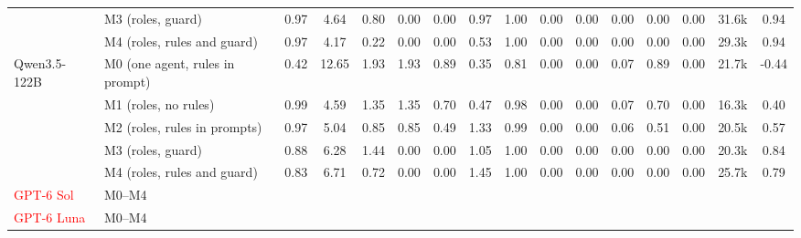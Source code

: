 \begin{tabular}{llcccccccccccccc}
 & M3 (roles, guard) & 0.97 & 4.64 & 0.80 & 0.00 & 0.00 & 0.97 & 1.00 & 0.00 & 0.00 & 0.00 & 0.00 & 0.00 & 31.6k & 0.94 \\
 & M4 (roles, rules and guard) & 0.97 & 4.17 & 0.22 & 0.00 & 0.00 & 0.53 & 1.00 & 0.00 & 0.00 & 0.00 & 0.00 & 0.00 & 29.3k & 0.94 \\
\midrule
Qwen3.5-122B & M0 (one agent, rules in prompt) & 0.42 & 12.65 & 1.93 & 1.93 & 0.89 & 0.35 & 0.81 & 0.00 & 0.00 & 0.07 & 0.89 & 0.00 & 21.7k & -0.44 \\
 & M1 (roles, no rules) & 0.99 & 4.59 & 1.35 & 1.35 & 0.70 & 0.47 & 0.98 & 0.00 & 0.00 & 0.07 & 0.70 & 0.00 & 16.3k & 0.40 \\
 & M2 (roles, rules in prompts) & 0.97 & 5.04 & 0.85 & 0.85 & 0.49 & 1.33 & 0.99 & 0.00 & 0.00 & 0.06 & 0.51 & 0.00 & 20.5k & 0.57 \\
 & M3 (roles, guard) & 0.88 & 6.28 & 1.44 & 0.00 & 0.00 & 1.05 & 1.00 & 0.00 & 0.00 & 0.00 & 0.00 & 0.00 & 20.3k & 0.84 \\
 & M4 (roles, rules and guard) & 0.83 & 6.71 & 0.72 & 0.00 & 0.00 & 1.45 & 1.00 & 0.00 & 0.00 & 0.00 & 0.00 & 0.00 & 25.7k & 0.79 \\
\midrule
\textcolor{red}{GPT-6 Sol} & M0--M4 &  &  &  &  &  &  &  &  &  &  &  &  &  &  \\
\midrule
\textcolor{red}{GPT-6 Luna} & M0--M4 &  &  &  &  &  &  &  &  &  &  &  &  &  &  \\
\bottomrule
\end{tabular}
